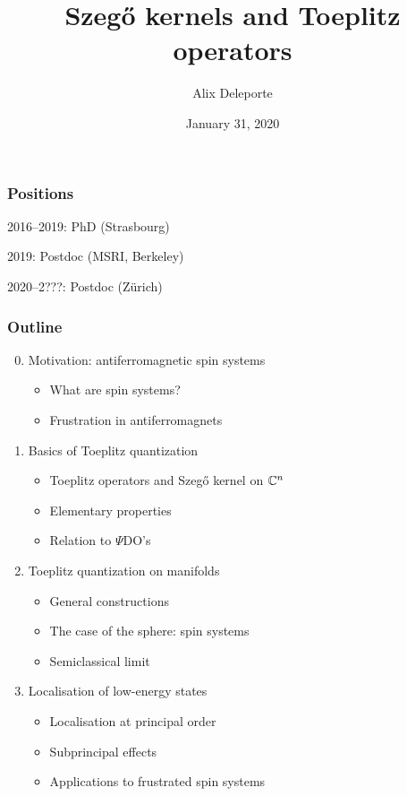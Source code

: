 \documentclass[mathserif]{beamer}
\title{Szeg\H{o} kernels and Toeplitz operators}
\author{Alix Deleporte}
\date{January 31, 2020}
\institute[UZH]{Institut für Mathematik\\Universität Zürich}
\begin{document}
\beamertemplatenavigationsymbolsempty

    \expandafter\def\expandafter\insertshorttitle\expandafter{%
       \insertshorttitle\hfill%
       }%


\begin{frame}
	\titlepage
      \end{frame}

      \begin{frame}
  \frametitle{Positions}
  2016--2019: PhD (Strasbourg)

  \vfill

  2019: Postdoc (MSRI, Berkeley)

  \vfill

  2020--2???: Postdoc (Zürich)
\end{frame}

      \begin{frame}
        \frametitle{Outline}
        \begin{enumerate}\setcounter{enumi}{-1}
        \item Motivation: antiferromagnetic spin systems
          \begin{itemize}
          \item What are spin systems?
          \item Frustration in antiferromagnets
          \end{itemize}
        \item Basics of Toeplitz quantization
          \begin{itemize}
          \item Toeplitz operators and Szeg\H{o} kernel on $\mathbb{C}^n$
          \item Elementary properties
          \item Relation to $\Psi$DO's
          \end{itemize}
        \item Toeplitz quantization on manifolds
          \begin{itemize}
          \item General constructions
          \item The case of the sphere: spin systems
          \item Semiclassical limit
          \end{itemize}
        \item Localisation of low-energy states
          \begin{itemize}
          \item Localisation at principal order
          \item Subprincipal effects
          \item Applications to frustrated spin systems
          \end{itemize}
        \end{enumerate}
      \end{frame}
\end{document}
